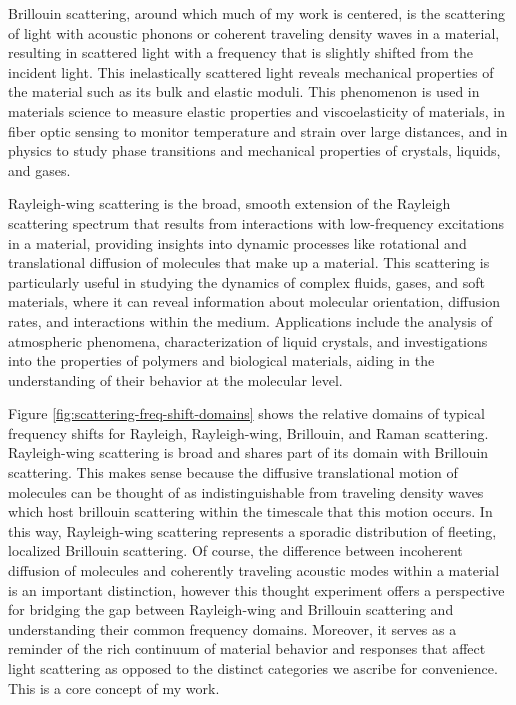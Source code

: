 Brillouin scattering, around which much of my work is centered, is the scattering of light with acoustic phonons or coherent traveling density waves in a material, resulting in scattered light with a frequency that is slightly shifted from the incident light. This inelastically scattered light reveals mechanical properties of the material such as its bulk and elastic moduli. This phenomenon is used in materials science to measure elastic properties and viscoelasticity of materials\cite{}, in fiber optic sensing to monitor temperature and strain over large distances\cite{}, and in physics to study phase transitions and mechanical properties of crystals, liquids, and gases\cite{}.

Rayleigh-wing scattering is the broad, smooth extension of the Rayleigh scattering spectrum that results from interactions with low-frequency excitations in a material, providing insights into dynamic processes like rotational and translational diffusion of molecules that make up a material. This scattering is particularly useful in studying the dynamics of complex fluids, gases, and soft materials, where it can reveal information about molecular orientation, diffusion rates, and interactions within the medium. Applications include the analysis of atmospheric phenomena\cite{}, characterization of liquid crystals\cite{}, and investigations into the properties of polymers and biological materials\cite{}, aiding in the understanding of their behavior at the molecular level.

Figure \ref{fig:scattering-freq-shift-domains} shows the relative domains of typical frequency shifts for Rayleigh, Rayleigh-wing, Brillouin, and Raman scattering. Rayleigh-wing scattering is broad and shares part of its domain with Brillouin scattering. This makes sense because the diffusive translational motion of molecules can be thought of as indistinguishable from traveling density waves which host brillouin scattering within the timescale that this motion occurs. In this way, Rayleigh-wing scattering represents a sporadic distribution of fleeting, localized Brillouin scattering. Of course, the difference between incoherent diffusion of molecules and coherently traveling acoustic modes within a material is an important distinction, however this thought experiment offers a perspective for bridging the gap between Rayleigh-wing and Brillouin scattering and understanding their common frequency domains. Moreover, it serves as a reminder of the rich continuum of material behavior and responses that affect light scattering as opposed to the distinct categories we ascribe for convenience. This is a core concept of my work.

